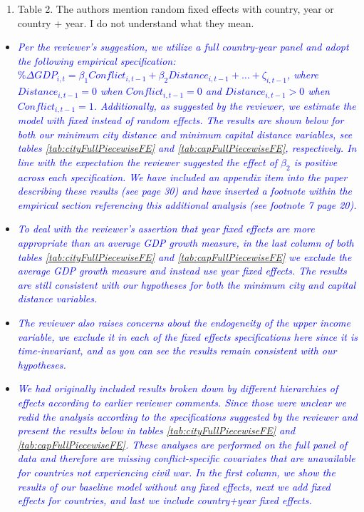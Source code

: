 \begin{enumerate}
\begin{enumerate}
	\item Table 2. The authors mention random fixed effects with country, year or country + year. I do not understand what they mean. \\
\end{enumerate}

\begin{itemize}
\item \textcolor{blue}{\emph{
	Per the reviewer's suggestion, we utilize a full country-year panel and adopt the following empirical specification: $\% \Delta GDP_{i,t} = \beta_{1}Conflict_{i,t-1} + \beta_{2}Distance_{i,t-1}+\ldots+\zeta_{i,t-1}$, where $Distance_{i,t-1}=0$ when $Conflict_{i,t-1}=0$ and $Distance_{i,t-1}>0$ when $Conflict_{i,t-1}=1$. Additionally, as suggested by the reviewer, we estimate the model with fixed instead of random effects. The results are shown below for both our minimum city distance and minimum capital distance variables, see tables \ref{tab:cityFullPiecewiseFE} and \ref{tab:capFullPiecewiseFE}, respectively. In line with the expectation the reviewer suggested the effect of $\beta_{2}$ is positive across each specification. We have included an appendix item into the paper describing these results (see page 30) and have inserted a footnote within the empirical section referencing this additional analysis (see footnote 7 page 20).
}} \\

\item \textcolor{blue}{\emph{
	To deal with the reviewer's assertion that year fixed effects are more appropriate than an average GDP growth measure, in the last column of both tables \ref{tab:cityFullPiecewiseFE} and \ref{tab:capFullPiecewiseFE} we exclude the average GDP growth measure and instead use year fixed effects. The results are still consistent with our hypotheses for both the minimum city and capital distance variables.
}} \\

\item \textcolor{blue}{\emph{
	The reviewer also raises concerns about the endogeneity of the upper income variable, we exclude it in each of the fixed effects specifications here since it is time-invariant, and as you can see the results remain consistent with our hypotheses.
}} \\

\item \textcolor{blue}{\emph{
	We had originally included results broken down by different hierarchies of effects according to earlier reviewer comments. Since those were unclear we redid the analysis according to the specifications suggested by the reviewer and present the results below in tables \ref{tab:cityFullPiecewiseFE} and \ref{tab:capFullPiecewiseFE}. These analyses are performed on the full panel of data and therefore are missing conflict-specific covariates that are unavailable for countries not experiencing civil war. In the first column, we show the results of our baseline model without any fixed effects, next we add fixed effects for countries, and last we include country+year fixed effects.
}} \\


\end{itemize}
\end{enumerate}
